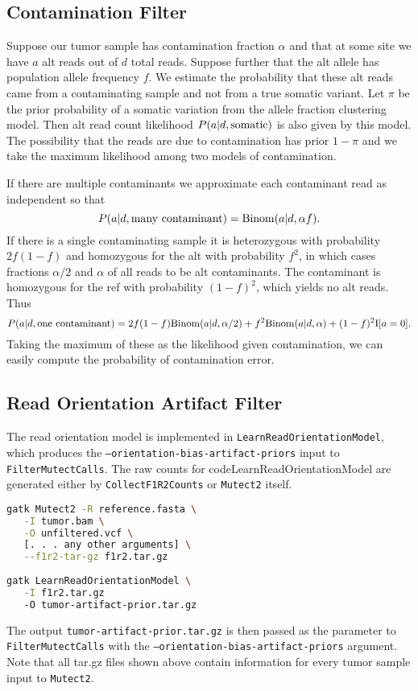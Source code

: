 \documentclass[nofootinbib,amssymb,amsmath]{revtex4}
\newcommand{\code}[1]{\texttt{#1}}
\begin{document}
\subsection{Contamination Filter}\label{contamination-filter}
Suppose our tumor sample has contamination fraction $\alpha$ and that at some site we have $a$ alt reads out of $d$ total reads.  Suppose further that the alt allele has population allele frequency $f$.  We estimate the probability that these alt reads came from a contaminating sample and not from a true somatic variant.  Let $\pi$ be the prior probability of a somatic variation from the allele fraction clustering model.  Then alt read count likelihood $P(a | d, {\rm somatic})$ is also given by this model.  The possibility that the reads are due to contamination has prior $1 - \pi$ and we take the maximum likelihood among two models of contamination.

If there are multiple contaminants we approximate each contaminant read as independent so that
\begin{equation}
P(a | d, {\rm many~contaminant}) = {\rm Binom}(a | d, \alpha f).
\end{equation}
If there is a single contaminating sample it is heterozygous with probability $2f(1-f)$ and homozygous for the alt with probability $f^2$, in which cases fractions $\alpha/2$ and $\alpha$ of all reads to be alt contaminants.  The contaminant is homozygous for the ref with probability $(1-f)^2$, which yields no alt reads. Thus
\begin{equation}
P(a | d, {\rm one~contaminant}) = 2f(1-f) {\rm Binom}(a | d, \alpha /2) + f^2 {\rm Binom}(a | d, \alpha) + (1-f)^2 {\rm I}[a = 0].
\end{equation}
Taking the maximum of these as the likelihood given contamination, we can easily compute the probability of contamination error.

\subsection{Read Orientation Artifact Filter}
The read orientation model is implemented in \code{LearnReadOrientationModel}, which produces the  \code{--orientation-bias-artifact-priors} input to \code{FilterMutectCalls}.  The raw counts for code{LearnReadOrientationModel} are generated either by \code{CollectF1R2Counts} or \code{Mutect2} itself.

\begin{lstlisting}[language=bash,caption={LearnReadOrientationModel command}, label={cmd-mutect2}]
gatk Mutect2 -R reference.fasta \
   -I tumor.bam \
   -O unfiltered.vcf \
   [. . . any other arguments] \
   --f1r2-tar-gz f1r2.tar.gz
   
gatk LearnReadOrientationModel \
   -I f1r2.tar.gz
   -O tumor-artifact-prior.tar.gz
\end{lstlisting}
The output \code{tumor-artifact-prior.tar.gz} is then passed as the parameter to \code{FilterMutectCalls} with the \code{--orientation-bias-artifact-priors} argument.  Note that all tar.gz files shown above contain information for every tumor sample input to \code{Mutect2}.
\end{document}
